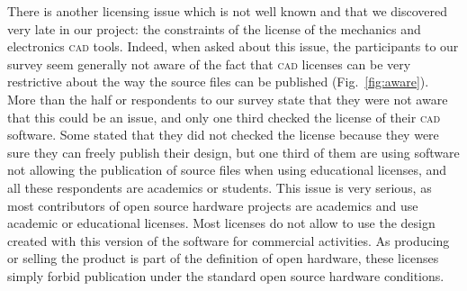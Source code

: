 \documentclass[letterpaper, 10 pt, conference]{ieeeconf}  %
\begin{document}
There is another licensing issue which is not well known and that we discovered very late in our project: the constraints of the license of the mechanics and electronics \textsc{cad} tools. 
Indeed, when asked about this issue, the participants to our survey seem generally not aware of the fact that \textsc{cad} licenses can be very restrictive about the way the source files can be published (Fig.~\ref{fig:aware}).
More than the half or respondents to our survey state that they were not aware that this could be an issue, and only one third checked the license of their \textsc{cad} software. 
Some stated that they did not checked the license because they were sure they can freely publish their design, but one third of them are using software not allowing the publication of source files when using educational licenses, and all these respondents are academics or students.
This issue is very serious, as most contributors of open source hardware projects are academics and use academic or educational licenses. 
Most licenses do not allow to use the design created with this version of the software for commercial activities. 
As producing or selling the product is part of the definition of open hardware, these licenses simply forbid publication under the standard open source hardware conditions. 
\end{document}
